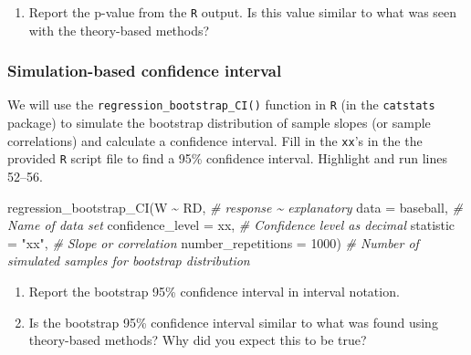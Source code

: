 \documentclass[
]{report}
\newenvironment{Shaded}{\begin{snugshade}}{\end{snugshade}}
\newcommand{\AttributeTok}[1]{\textcolor[rgb]{0.77,0.63,0.00}{#1}}
\newcommand{\CommentTok}[1]{\textcolor[rgb]{0.56,0.35,0.01}{\textit{#1}}}
\newcommand{\DecValTok}[1]{\textcolor[rgb]{0.00,0.00,0.81}{#1}}
\newcommand{\FunctionTok}[1]{\textcolor[rgb]{0.00,0.00,0.00}{#1}}
\newcommand{\NormalTok}[1]{#1}
\newcommand{\SpecialCharTok}[1]{\textcolor[rgb]{0.00,0.00,0.00}{#1}}
\newcommand{\StringTok}[1]{\textcolor[rgb]{0.31,0.60,0.02}{#1}}
\providecommand{\tightlist}{%
  \setlength{\itemsep}{0pt}\setlength{\parskip}{0pt}}
\begin{document}
\begin{enumerate}
\def\labelenumi{\arabic{enumi}.}
\setcounter{enumi}{2}
\tightlist
\item
  Report the p-value from the \texttt{R} output. Is this value similar to what was seen with the theory-based methods?
\end{enumerate}

\vspace{0.5in}

\hypertarget{simulation-based-confidence-interval}{%
\subsubsection*{Simulation-based confidence interval}\label{simulation-based-confidence-interval}}

We will use the \texttt{regression\_bootstrap\_CI()} function in \texttt{R} (in the \texttt{catstats} package) to simulate the bootstrap distribution of sample slopes (or sample correlations) and calculate a confidence interval. Fill in the \texttt{xx}'s in the the provided \texttt{R} script file to find a 95\% confidence interval. Highlight and run lines 52--56.

\begin{Shaded}
\begin{Highlighting}[]
\FunctionTok{regression\_bootstrap\_CI}\NormalTok{(W }\SpecialCharTok{\textasciitilde{}}\NormalTok{ RD, }\CommentTok{\# response \textasciitilde{} explanatory}
   \AttributeTok{data =}\NormalTok{ baseball, }\CommentTok{\# Name of data set}
   \AttributeTok{confidence\_level =}\NormalTok{ xx, }\CommentTok{\# Confidence level as decimal}
   \AttributeTok{statistic =} \StringTok{"xx"}\NormalTok{, }\CommentTok{\# Slope or correlation}
   \AttributeTok{number\_repetitions =} \DecValTok{1000}\NormalTok{) }\CommentTok{\# Number of simulated samples for bootstrap distribution}
\end{Highlighting}
\end{Shaded}

\begin{enumerate}
\def\labelenumi{\arabic{enumi}.}
\setcounter{enumi}{3}
\item
  Report the bootstrap 95\% confidence interval in interval notation.\\
  \vspace{0.5in}
\item
  Is the bootstrap 95\% confidence interval similar to what was found using theory-based methods? Why did you expect this to be true?
\end{enumerate}
\end{document}
